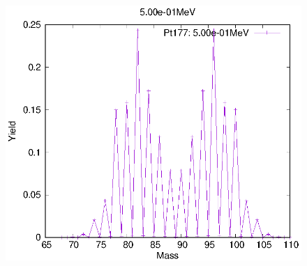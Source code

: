\begin{figure}[htbp]
\begin{minipage}{0.33\textwidth} \begin{center} \includegraphics[width=\textwidth]{YA/Pt177_5.00e-01.eps} \end{center} \end{minipage}
\end{figure}
